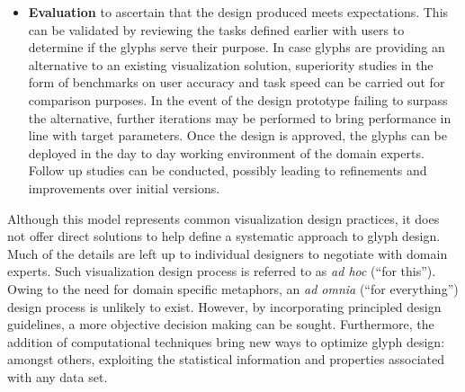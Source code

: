 \begin{itemize}

\item \textbf{Evaluation} to ascertain that the design produced meets expectations. 
This can be validated by reviewing the tasks defined earlier with users to determine if the glyphs serve their purpose. 
In case glyphs are providing an alternative to an existing visualization solution, superiority studies in the form of benchmarks on user accuracy and task speed can be carried out for comparison purposes.
In the event of the design prototype failing to surpass the alternative, further iterations may be performed to bring performance in line with target parameters. 
Once the design is approved, the glyphs can be deployed in the day to day working environment of the domain experts.
Follow up studies can be conducted, possibly leading to refinements and improvements over initial versions.
\end{itemize}

Although this model represents common visualization design practices, it does not offer direct solutions to help define a systematic approach to glyph design.
Much of the details are left up to individual designers to negotiate with domain experts.
Such visualization design process is referred to as \emph{ad hoc} (``for this'').
Owing to the need for domain specific metaphors, an \emph{ad omnia} (``for everything'') design process is unlikely to exist.
However, by incorporating principled design guidelines, a more objective decision making can be sought.
Furthermore, the addition of computational techniques bring new ways to optimize glyph design: amongst others, exploiting the statistical information and properties associated with any data set.

